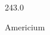 \documentclass[12pt]{article}
\begin{document}
\hfill{}
\vfill
\begin{center}
  {\fontsize{50}{60}
  }

  \vspace{1em}

  243.0

Americium
\end{center}
\vfill
\end{document}
